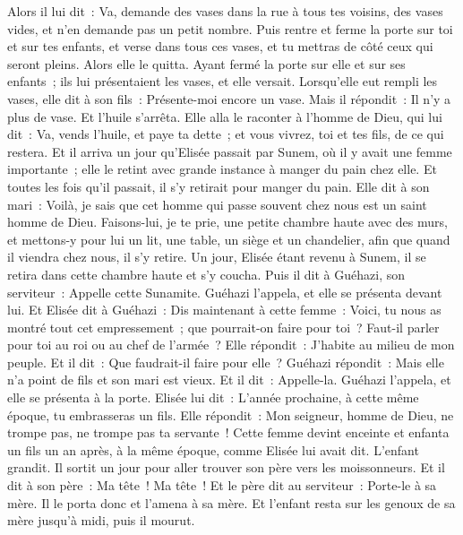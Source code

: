 \begin{multicols}{2}
Alors il lui dit~: Va, demande des vases dans la rue à tous tes voisins, des vases vides, et n'en demande pas un petit nombre.
Puis rentre et ferme la porte sur toi et sur tes enfants, et verse dans tous ces vases, et tu mettras de côté ceux qui seront pleins.
Alors elle le quitta. Ayant fermé la porte sur elle et sur ses enfants~; ils lui présentaient les vases, et elle versait.
Lorsqu'elle eut rempli les vases, elle dit à son fils~: Présente-moi encore un vase. Mais il répondit~: Il n'y a plus de vase. Et l'huile s'arrêta.
Elle alla le raconter à l'homme de Dieu, qui lui dit~: Va, vends l'huile, et paye ta dette~; et vous vivrez, toi et tes fils, de ce qui restera.
Et il arriva un jour qu'Elisée passait par Sunem, où il y avait une femme importante~; elle le retint avec grande instance à manger du pain chez elle. Et toutes les fois qu'il passait, il s'y retirait pour manger du pain.
Elle dit à son mari~: Voilà, je sais que cet homme qui passe souvent chez nous est un saint homme de Dieu.
Faisons-lui, je te prie, une petite chambre haute avec des murs, et mettons-y pour lui un lit, une table, un siège et un chandelier, afin que quand il viendra chez nous, il s'y retire.
Un jour, Elisée étant revenu à Sunem, il se retira dans cette chambre haute et s'y coucha.
Puis il dit à Guéhazi, son serviteur~: Appelle cette Sunamite. Guéhazi l'appela, et elle se présenta devant lui.
Et Elisée dit à Guéhazi~: Dis maintenant à cette femme~: Voici, tu nous as montré tout cet empressement~; que pourrait-on faire pour toi~? Faut-il parler pour toi au roi ou au chef de l'armée~? Elle répondit~: J'habite au milieu de mon peuple.
Et il dit~: Que faudrait-il faire pour elle~? Guéhazi répondit~: Mais elle n'a point de fils et son mari est vieux.
Et il dit~: Appelle-la. Guéhazi l'appela, et elle se présenta à la porte.
Elisée lui dit~: L'année prochaine, à cette même époque, tu embrasseras un fils. Elle répondit~: Mon seigneur, homme de Dieu, ne trompe pas, ne trompe pas ta servante~!
Cette femme devint enceinte et enfanta un fils un an après, à la même époque, comme Elisée lui avait dit.
L'enfant grandit. Il sortit un jour pour aller trouver son père vers les moissonneurs.
Et il dit à son père~: Ma tête~! Ma tête~! Et le père dit au serviteur~: Porte-le à sa mère.
Il le porta donc et l'amena à sa mère. Et l'enfant resta sur les genoux de sa mère jusqu'à midi, puis il mourut.

\end{multicols}
